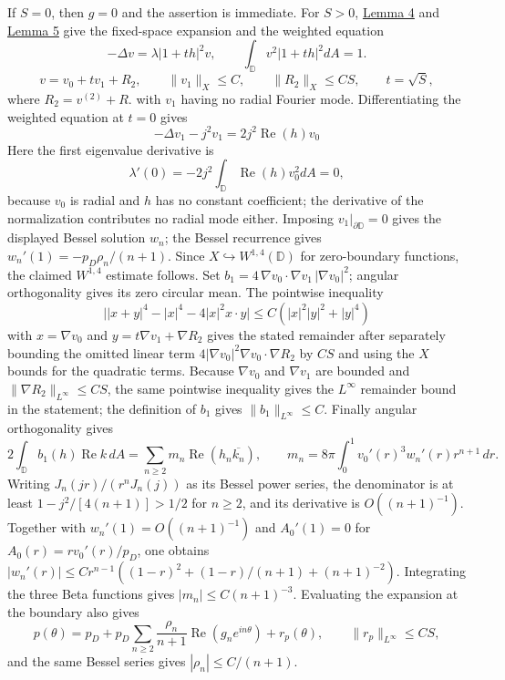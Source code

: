 \documentclass[11pt]{article}
\begin{document}
If \(S=0\), then \(g=0\) and the assertion is immediate. For \(S>0\),
\hyperref[lem-c1-perturbation]{Lemma 4} and
\hyperref[lem-disk-perturbation]{Lemma 5} give the fixed-space expansion
and the weighted equation \[
-\Delta v=\lambda|1+th|^2v,
\qquad \int_{\mathbb D}v^2|1+th|^2dA=1.
\] \[
v=v_0+t v_1+R_2,
\qquad \|v_1\|_X\le C,
\qquad \|R_2\|_X\le CS,
\qquad t=\sqrt S,
\] where \(R_2=v^{(2)}+R\). with \(v_1\) having no radial Fourier mode.
Differentiating the weighted equation at \(t=0\) gives \[
-\Delta v_1-j^2v_1=2j^2\operatorname{Re}(h)v_0
\] Here the first eigenvalue derivative is \[
\lambda'(0)=-2j^2\int_{\mathbb D}\operatorname{Re}(h)v_0^2dA=0,
\] because \(v_0\) is radial and \(h\) has no constant coefficient; the
derivative of the normalization contributes no radial mode either.
Imposing \(v_1|_{\partial\mathbb D}=0\) gives the displayed Bessel
solution \(w_n\); the Bessel recurrence gives
\(w_n'(1)=-p_D\rho_n/(n+1)\). Since
\(X\hookrightarrow W^{1,4}(\mathbb D)\) for zero-boundary functions, the
claimed \(W^{1,4}\) estimate follows. Set
\(b_1=4\,\nabla v_0\cdot\nabla v_1\,|\nabla v_0|^2\); angular
orthogonality gives its zero circular mean. The pointwise inequality \[
\bigl||x+y|^4-|x|^4-4|x|^2x\cdot y\bigr|\le C(|x|^2|y|^2+|y|^4)
\] with \(x=\nabla v_0\) and \(y=t\nabla v_1+\nabla R_2\) gives the
stated remainder after separately bounding the omitted linear term
\(4|\nabla v_0|^2\nabla v_0\cdot\nabla R_2\) by \(CS\) and using the
\(X\) bounds for the quadratic terms. Because \(\nabla v_0\) and
\(\nabla v_1\) are bounded and \(\|\nabla R_2\|_{L^\infty}\le CS\), the
same pointwise inequality gives the \(L^\infty\) remainder bound in the
statement; the definition of \(b_1\) gives \(\|b_1\|_{L^\infty}\le C\).
Finally angular orthogonality gives \[
2\int_{\mathbb D}b_1(h)\operatorname{Re}k\,dA
=\sum_{n\ge2}m_n\operatorname{Re}(h_n\overline{k_n}),
\qquad
m_n=8\pi\int_0^1v_0'(r)^3w_n'(r)r^{n+1}\,dr.
\] Writing \(J_n(jr)/(r^nJ_n(j))\) as its Bessel power series, the
denominator is at least \(1-j^2/[4(n+1)]>1/2\) for \(n\ge2\), and its
derivative is \(O((n+1)^{-1})\). Together with \(w_n'(1)=O((n+1)^{-1})\)
and \(A_0'(1)=0\) for \(A_0(r)=rv_0'(r)/p_D\), one obtains
\(|w_n'(r)|\le Cr^{n-1}((1-r)^2+(1-r)/(n+1)+(n+1)^{-2})\). Integrating
the three Beta functions gives \(|m_n|\le C(n+1)^{-3}\). Evaluating the
expansion at the boundary also gives \[
p(\theta)=p_D+p_D\sum_{n\ge2}\frac{\rho_n}{n+1}\operatorname{Re}(g_ne^{in\theta})+r_p(\theta),
\qquad \|r_p\|_{L^\infty}\le CS,
\] and the same Bessel series gives \(|\rho_n|\le C/(n+1)\).
\end{document}
